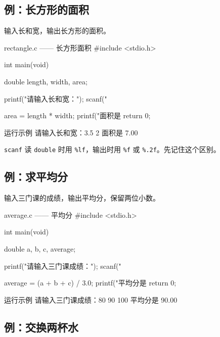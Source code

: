 \subsection{例：长方形的面积}

\begin{example}
输入长和宽，输出长方形的面积。
\end{example}
\begin{solution}
\begin{codebox}{rectangle.c —— 长方形面积}
#include <stdio.h>

int main(void)
{
    double length, width, area;

    printf("请输入长和宽：");
    scanf("%

    area = length * width;
    printf("面积是 %
    return 0;
}
\end{codebox}

\begin{outbox}{运行示例}
请输入长和宽：3.5 2
面积是 7.00
\end{outbox}

\texttt{scanf} 读 \texttt{double} 时用 \texttt{\%lf}，输出时用 \texttt{\%f} 或 \texttt{\%.2f}。先记住这个区别。
\end{solution}

\subsection{例：求平均分}

\begin{example}
输入三门课的成绩，输出平均分，保留两位小数。
\end{example}
\begin{solution}
\begin{codebox}{average.c —— 平均分}
#include <stdio.h>

int main(void)
{
    double a, b, c, average;

    printf("请输入三门课成绩：");
    scanf("%

    average = (a + b + c) / 3.0;
    printf("平均分是 %
    return 0;
}
\end{codebox}

\begin{outbox}{运行示例}
请输入三门课成绩：80 90 100
平均分是 90.00
\end{outbox}
\end{solution}

\subsection{例：交换两杯水}

